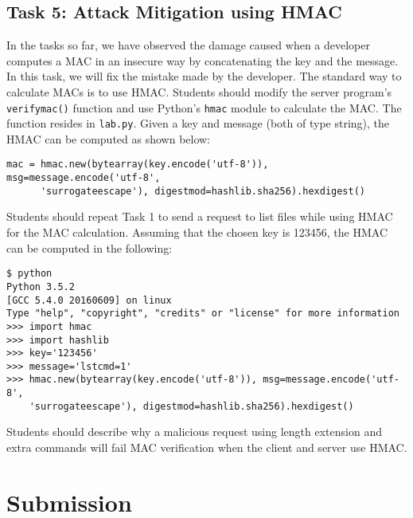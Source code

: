 \subsection{Task 5: Attack Mitigation using HMAC}

In the tasks so far, we have observed the damage caused when a developer
computes a MAC in an insecure way by concatenating the key and the message.
In this task, we will fix the mistake made by the developer. The standard
way to calculate MACs is to use HMAC. Students
should modify the server program's \texttt{verify\textunderscore mac()}
function and use Python's \texttt{hmac} module to calculate the MAC. The
function resides in \texttt{lab.py}. Given a key and message (both of type
string), the HMAC can be computed as shown below:

\begin{lstlisting}
mac = hmac.new(bytearray(key.encode('utf-8')), msg=message.encode('utf-8', 
      'surrogateescape'), digestmod=hashlib.sha256).hexdigest()
\end{lstlisting}

Students should repeat Task 1 to send a request to list files while using HMAC for 
the MAC calculation. Assuming that the chosen key is 123456, the HMAC can be computed 
in the following:

\begin{lstlisting}
$ python
Python 3.5.2
[GCC 5.4.0 20160609] on linux
Type "help", "copyright", "credits" or "license" for more information
>>> import hmac
>>> import hashlib
>>> key='123456'
>>> message='lstcmd=1'
>>> hmac.new(bytearray(key.encode('utf-8')), msg=message.encode('utf-8', 
	'surrogateescape'), digestmod=hashlib.sha256).hexdigest()
\end{lstlisting}

Students should describe why a malicious request using length extension and
extra commands will fail MAC verification when the client and server use
HMAC.


\section{Submission} 
















